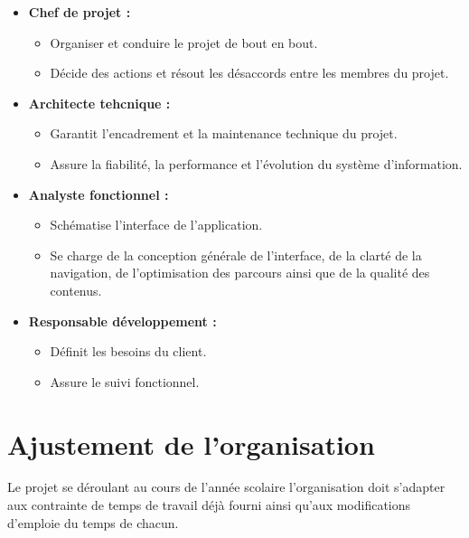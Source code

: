 \begin{itemize}
	\item  \textbf{Chef de projet :} \newline
	\begin{itemize}
		\item Organiser et conduire le projet de bout en bout.
		\item Décide des actions et résout les désaccords entre les membres du projet.\newline
	\end{itemize}

	\item \textbf{Architecte tehcnique :} \newline
	\begin{itemize}
		\item Garantit l'encadrement et la maintenance technique du projet.
		\item Assure la fiabilité, la performance et l'évolution du système d'information.\newline
	\end{itemize}
	\newpage

	\item \textbf{Analyste fonctionnel :} \newline
	\begin{itemize}
		\item Schématise l’interface de l’application.
		\item Se charge de la conception générale de l’interface, de la clarté de la
		navigation, de l’optimisation des parcours ainsi que de la qualité des
		contenus.\newline
	\end{itemize}
	
	\item \textbf{Responsable développement :} \newline
	\begin{itemize}
		\item Définit les besoins du client.
		\item Assure le suivi fonctionnel.\newline
	\end{itemize}
\end{itemize}

\section{Ajustement de l'organisation}

Le projet se déroulant au cours de l'année scolaire l'organisation doit s'adapter aux
contrainte de temps de travail déjà fourni ainsi qu'aux modifications d'emploie
du temps de chacun.\newline

